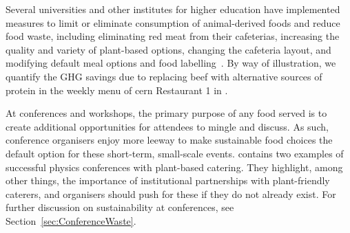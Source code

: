 \documentclass[../SustainableHEP.tex]{subfiles}
\begin{document}
Several universities and other institutes for higher education have implemented measures to limit or eliminate consumption of animal-derived foods and reduce food waste, including eliminating red meat from their cafeterias, increasing the quality and variety of plant-based options, changing the cafeteria layout, and modifying default meal options and food labelling~\cite{Berlin, EPFL, Cambridge, Goldsmiths}.    By way of illustration, we quantify the GHG savings due to replacing beef with alternative sources of protein in the weekly menu of \acrshort{cern} Restaurant 1 in .

At conferences and workshops, the primary purpose of any food served is to create additional opportunities for attendees to mingle and discuss.  As such, conference organisers enjoy more leeway to make sustainable food choices the default option for these short-term, small-scale events.   contains two examples of successful physics conferences with plant-based catering. They highlight, among other things, the importance of institutional partnerships with plant-friendly caterers, and organisers should push for these if they do not already exist.  For further discussion on sustainability at conferences, see Section~\ref{sec:ConferenceWaste}.
\end{document}
